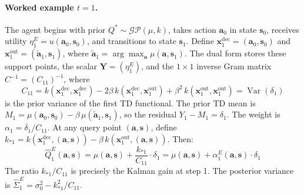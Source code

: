 \paragraph{Worked example $t = 1$.}
The agent begins with prior $Q^* \sim \mathcal{GP}(\mu, k)$, takes action
$\mathbf{a}_0$ in state $\mathbf{s}_0$, receives utility
$\eta^E_1 = u(\mathbf{a}_0, \mathbf{s}_0)$, and transitions to state
$\mathbf{s}_1$. Define $\mathbf{x}^{\mathrm{dec}}_1 = (\mathbf{a}_0,
\mathbf{s}_0)$ and $\mathbf{x}^{\mathrm{out}}_1 = (\tilde{\mathbf{a}}_1,
\mathbf{s}_1)$, where $\tilde{\mathbf{a}}_1 = \arg\max_{\mathbf{a}}
\mu(\mathbf{a}, \mathbf{s}_1)$. The dual form stores these support points,
the scalar $\mathbf{Y} = (\eta^E_1)$, and the $1 \times 1$ inverse Gram
matrix $C^{-1} = (C_{11})^{-1}$, where
\begin{equation}
    C_{11} = k(\mathbf{x}^{\mathrm{dec}}_1, \mathbf{x}^{\mathrm{dec}}_1)
    - 2\beta\, k(\mathbf{x}^{\mathrm{dec}}_1, \mathbf{x}^{\mathrm{out}}_1)
    + \beta^2\, k(\mathbf{x}^{\mathrm{out}}_1, \mathbf{x}^{\mathrm{out}}_1)
    = \operatorname{Var}(\delta_1)
\end{equation}
is the prior variance of the first TD functional. The prior TD mean is
$M_1 = \mu(\mathbf{a}_0, \mathbf{s}_0) - \beta\,\mu(\tilde{\mathbf{a}}_1,
\mathbf{s}_1)$, so the residual $Y_1 - M_1 = \delta_1$. The weight is
$\alpha_1 = \delta_1 / C_{11}$. At any query point $(\mathbf{a}, \mathbf{s})$,
define $k_{*1} = k(\mathbf{x}^{\mathrm{dec}}_1, (\mathbf{a}, \mathbf{s}))
- \beta\, k(\mathbf{x}^{\mathrm{out}}_1, (\mathbf{a}, \mathbf{s}))$. Then:
\begin{equation}
    \hat{Q}^E_1(\mathbf{a}, \mathbf{s})
    = \mu(\mathbf{a}, \mathbf{s}) + \frac{k_{*1}}{C_{11}} \cdot \delta_1
    = \mu(\mathbf{a}, \mathbf{s}) + \alpha^E_1(\mathbf{a}, \mathbf{s}) \cdot \delta_1
\end{equation}
The ratio $k_{*1}/C_{11}$ is precisely the Kalman gain at step 1. 
The posterior variance is $\hat{\Sigma}^E_1 = \sigma^2_0 - k_{*1}^2 / C_{11}$.

